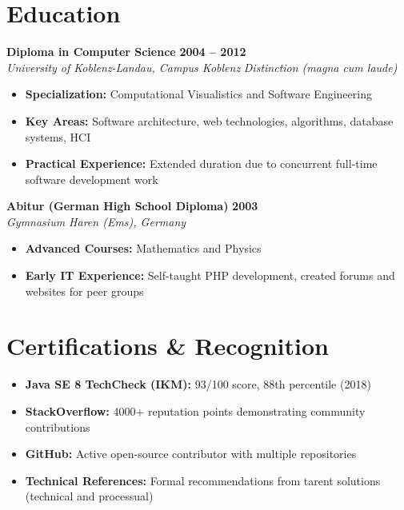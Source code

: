 \documentclass[11pt,a4paper]{article}
\begin{document}
\newpage

\section{Education}

\textbf{Diploma in Computer Science} \hfill \textbf{2004 -- 2012}\\
\textit{University of Koblenz-Landau, Campus Koblenz} \hfill \textit{Distinction (magna cum laude)}

\begin{itemize}[leftmargin=*,noitemsep,topsep=0pt]
\item \textbf{Specialization:} Computational Visualistics and Software Engineering
\item \textbf{Key Areas:} Software architecture, web technologies, algorithms, database systems, HCI
\item \textbf{Practical Experience:} Extended duration due to concurrent full-time software development work
\end{itemize}

\textbf{Abitur (German High School Diploma)} \hfill \textbf{2003}\\
\textit{Gymnasium Haren (Ems), Germany}
\begin{itemize}[leftmargin=*,noitemsep,topsep=0pt]
\item \textbf{Advanced Courses:} Mathematics and Physics
\item \textbf{Early IT Experience:} Self-taught PHP development, created forums and websites for peer groups
\end{itemize}

\section{Certifications \& Recognition}

\begin{itemize}[leftmargin=*,noitemsep,topsep=0pt]
\item \textbf{Java SE 8 TechCheck (IKM):} 93/100 score, 88th percentile (2018)
\item \textbf{StackOverflow:} 4000+ reputation points demonstrating community contributions
\item \textbf{GitHub:} Active open-source contributor with multiple repositories
\item \textbf{Technical References:} Formal recommendations from tarent solutions (technical and processual)
\end{itemize}
\end{document}

